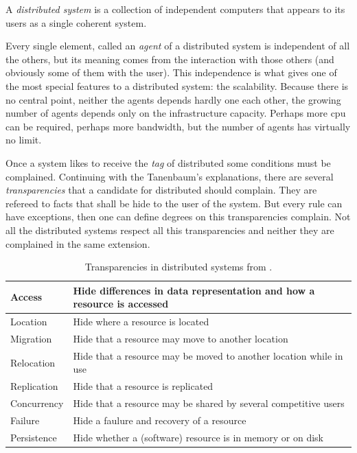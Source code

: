 \documentclass[10pt,a4paper,twoside]{llncs}
\begin{document}
\begin{definition}\label{def:distributedSystem}
    A \emph{distributed system} is a collection of independent computers that appears to its users as a single coherent system.
\end{definition}

Every single element, called an \emph{agent} of a distributed system is independent of all the others, but its meaning comes from the interaction with those others (and obviously some of them with the user). This independence is what gives one of the most special features to a distributed system: the scalability. Because there is no central point, neither the agents depends hardly one each other, the growing number of agents depends only on the infrastructure capacity. Perhaps more cpu can be required, perhaps more bandwidth, but the number of agents has virtually no limit.

Once a system likes to receive the \emph{tag} of distributed some conditions must be complained. Continuing with the Tanenbaum's explanations, there are several \emph{transparencies} that a candidate for distributed should complain. They are refereed to facts that shall be hide to the user of the system. But every rule can have exceptions, then one can define degrees on this transparencies complain. Not all the distributed systems respect all this transparencies and neither they are complained in the same extension.

\begin{table}[h]
    \begin{center}
        \begin{tabular}{|l|l|}
            \hline
            Access & Hide differences in data representation and how a resource is accessed \\ \hline
            Location & Hide where a resource is located \\ \hline
            Migration & Hide that a resource may move to another location \\ \hline
            Relocation & Hide that a resource may be moved to another location while in use \\ \hline
            Replication & Hide that a resource is replicated \\ \hline
            Concurrency & Hide that a resource may be shared by several competitive users \\ \hline
            Failure & Hide a faulure and recovery of a resource \\ \hline
            Persistence & Hide whether a (software) resource is in memory or on disk \\ \hline
        \end{tabular}
        \caption{Transparencies in distributed systems from \cite{TanenbaumDistr}.}\label{tab:transparencies}
    \end{center}
\end{table}
\end{document}

